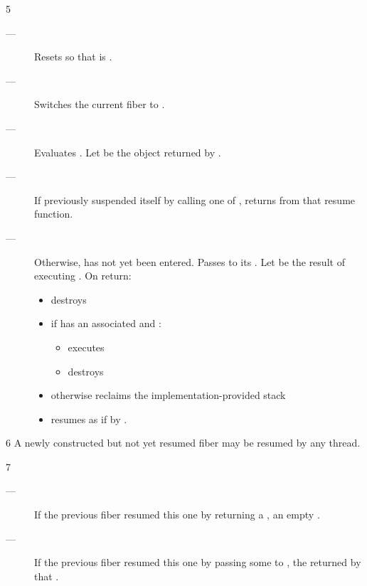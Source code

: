 5 \effects
\begin{description}
    \item[---] Resets \state so that \emptyfn is \true.
    \item[---] Switches the current fiber to .
    \item[---] Evaluates .
               Let  be the \fiber object returned by .
    \item[---] If  previously
               suspended itself by calling one of \anyresume,
               returns  from that resume function.
    \item[---] Otherwise,  has not yet been entered.
               Passes  to its \entryfn.
               Let \continuation be the result of executing
               . On return:
        \begin{itemize}
            \item destroys 
            \item if  has an associated  and :
                \begin{itemize}
                    \item executes 
                    \item destroys 
                \end{itemize}
            \item otherwise reclaims the implementation-provided stack
            \item resumes \continuation as if by .
        \end{itemize}
\end{description}

6 \remarks
A newly constructed but not yet resumed fiber may be resumed by
any thread.

7 \returns
\begin{description}
    \item[---] If the previous fiber resumed this one by returning a \fiber,
               an empty \fiber.
    \item[---] If the previous fiber resumed this one by passing some 
               to \anyresumewith, the \fiber returned by that .
\end{description}

